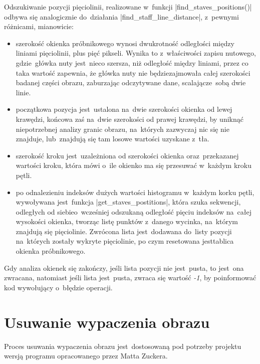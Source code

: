Odszukiwanie pozycji pięciolinii, realizowane w~funkcji \pyth|find_staves_positions()| odbywa się analogicznie do~działania \pyth|find_staff_line_distance|, z~pewnymi różnicami, mianowicie:
\begin{itemize}
	\item szerokość okienka próbnikowego wynosi dwukrotność odległości między liniami pięciolinii, plus pięć pikseli. Wynika to z~właściwości zapisu nutowego, gdzie~główka nuty jest~nieco szersza, niż odległość między liniami, przez co taka wartość zapewnia, że główka nuty nie będzie\linebreak zajmowała całej szerokości badanej części obrazu, zaburzając odczytywane dane, scalając\linebreak ze~sobą dwie linie.
	\item początkowa pozycja jest~ustalona na~dwie szerokości okienka od lewej krawędzi, końcowa zaś na~dwie szerokości od prawej krawędzi, by uniknąć niepotrzebnej analizy granic obrazu, na~których zazwyczaj nic się nie znajduje, lub~znajdują się tam losowe wartości uzyskane z~tła.
	\item szerokość kroku jest~uzależniona od szerokości okienka oraz~przekazanej wartości kroku, która mówi o~ile okienko ma się przesuwać w~każdym kroku pętli.
	\item po odnalezieniu indeksów dużych wartości histogramu w~każdym korku pętli, wywoływana jest~funkcja \pyth|get_staves_postitions|, która szuka sekwencji, odległych od siebie\linebreak o~wcześniej odszukaną odległość pięciu indeksów na~całej wysokości okienka, tworząc listę punktów z~danego wycinka, na~którym znajdują się pięciolinie. Zwrócona lista jest~dodawana do~listy pozycji na~których zostały wykryte pięciolinie, po czym resetowana jest\linebreak tablica okienka próbnikowego.
\end{itemize}


Gdy analiza okienek się zakończy, jeśli lista pozycji nie jest~pusta, to jest~ona zwracana, natomiast jeśli lista jest~pusta, zwraca się wartość \textit{-1}, by poinformować kod wywołujący o~błędzie operacji.

\newpage

\section{Usuwanie wypaczenia obrazu}

Proces usuwania wypaczenia obrazu jest~dostosowaną pod potrzeby projektu wersją programu opracowanego przez Matta Zuckera\cite{Zucker2016}.

